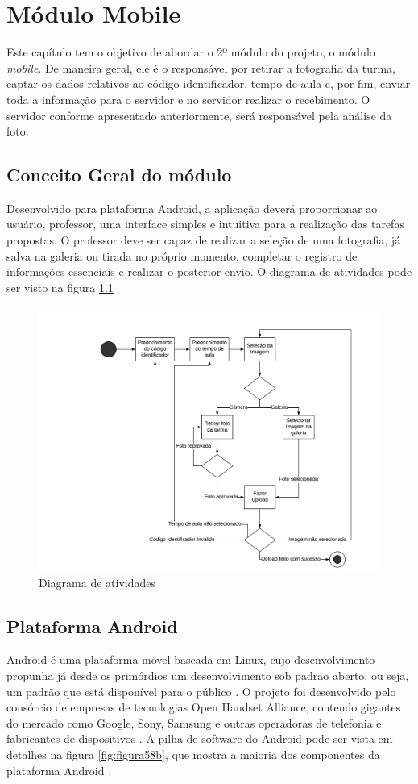 \chapter{Módulo Mobile}
\noindent
Este capítulo tem o objetivo de abordar o 2º módulo do projeto, o módulo \textit{mobile}. De maneira geral, ele é o responsável por retirar a fotografia da turma, captar os dados relativos ao código identificador, tempo de aula e, por fim, enviar toda a informação para o servidor e no servidor realizar o recebimento. O servidor conforme apresentado anteriormente, será responsável pela análise da foto. 
\section{Conceito Geral do módulo}
\noindent
Desenvolvido para plataforma Android, a aplicação deverá proporcionar ao usuário, professor, uma interface simples e intuitiva para a realização das tarefas propostas. O professor deve ser capaz de realizar a seleção de uma fotografia, já salva na galeria ou tirada no próprio momento, completar o registro de informações essenciais e realizar o posterior envio. O diagrama de atividades pode ser visto na figura \ref{fig:figura80}
\begin{figure}[!ht]
	\centering
\includegraphics[width=1.0\textwidth]{diagrama_atividades.png}
	\caption{Diagrama de atividades}
	\label{fig:figura80}
\end{figure}

\section{Plataforma Android}
Android é uma plataforma móvel baseada em Linux, cujo desenvolvimento propunha já desde os primórdios um desenvolvimento sob padrão aberto, ou seja, um padrão que está disponível para o público \citep{Android1}. O projeto foi desenvolvido pelo consórcio de empresas de tecnologias Open Handset Alliance, contendo gigantes do mercado como Google, Sony, Samsung e outras operadoras de telefonia e fabricantes de dispositivos \citep{Android2}.  A pilha de software do Android pode ser vista em detalhes na figura \ref{fig:figura58b}, que mostra a maioria dos componentes da plataforma Android \citep{Android1}.

